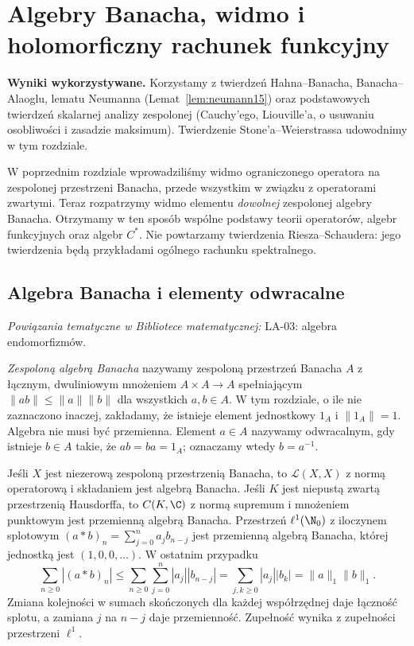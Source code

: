 \setcounter{section}{30}
\section{Algebry Banacha, widmo i holomorficzny rachunek funkcyjny}
\label{sec:banach-algebras31}

\providecommand{\atlasref}[2]{#2}

\noindent\textbf{Wyniki wykorzystywane.}
Korzystamy z twierdzeń Hahna--Banacha, Banacha--Alaoglu,
lematu Neumanna (Lemat~\ref{lem:neumann15}) oraz podstawowych
twierdzeń skalarnej analizy zespolonej (Cauchy'ego, Liouville'a,
o usuwaniu osobliwości i zasadzie maksimum). Twierdzenie
Stone'a--Weierstrassa udowodnimy w tym rozdziale.
\par\medskip

W poprzednim rozdziale wprowadziliśmy widmo ograniczonego operatora
na zespolonej przestrzeni Banacha, przede wszystkim w związku z operatorami
zwartymi. Teraz rozpatrzymy widmo elementu \emph{dowolnej} zespolonej algebry
Banacha. Otrzymamy w ten sposób wspólne podstawy teorii operatorów, algebr
funkcyjnych oraz algebr $C^*$. Nie powtarzamy twierdzenia Riesza--Schaudera:
jego twierdzenia będą przykładami ogólnego rachunku spektralnego.

\subsection{Algebra Banacha i elementy odwracalne}

\noindent\emph{Powiązania tematyczne w Bibliotece matematycznej:} \atlasref{LA-03::prop:lin3-end-algebra}{LA-03: algebra endomorfizmów}.


\begin{definicja}
\label{def:banach-algebra31}
\emph{Zespoloną algebrą Banacha} nazywamy zespoloną przestrzeń Banacha
$A$ z łącznym, dwuliniowym mnożeniem $A\times A\to A$ spełniającym
$\|ab\|\le\|a\|\|b\|$ dla wszystkich $a,b\in A$.
W tym rozdziale, o ile nie zaznaczono inaczej, zakładamy, że istnieje
element jednostkowy $1_A$ i $\|1_A\|=1$. Algebra nie musi być przemienna.
Element $a\in A$ nazywamy odwracalnym, gdy istnieje $b\in A$ takie,
że $ab=ba=1_A$; oznaczamy wtedy $b=a^{-1}$.
\end{definicja}

\begin{przyklad}
\label{ex:banach-algebras31}
Jeśli $X$ jest niezerową zespoloną przestrzenią Banacha, to $\mathcal L(X,X)$
z normą operatorową i składaniem jest algebrą Banacha.
Jeśli $K$ jest niepustą zwartą przestrzenią Hausdorffa, to $C(K,\C)$
z normą supremum i mnożeniem punktowym jest przemienną algebrą Banacha.
Przestrzeń $\ell^1(\N_0)$ z iloczynem splotowym
$(a*b)_n=\sum_{j=0}^n a_jb_{n-j}$ jest przemienną algebrą Banacha,
której jednostką jest $(1,0,0,\ldots)$.
W ostatnim przypadku
\[
\sum_{n\ge0}|(a*b)_n|\le
\sum_{n\ge0}\sum_{j=0}^n|a_j||b_{n-j}|
=\sum_{j,k\ge0}|a_j||b_k|=\|a\|_1\|b\|_1.
\]
Zmiana kolejności w sumach skończonych dla każdej
współrzędnej daje łączność splotu, a zamiana $j$ na
$n-j$ daje przemienność. Zupełność wynika z zupełności
przestrzeni $\ell^1$.
\end{przyklad}

